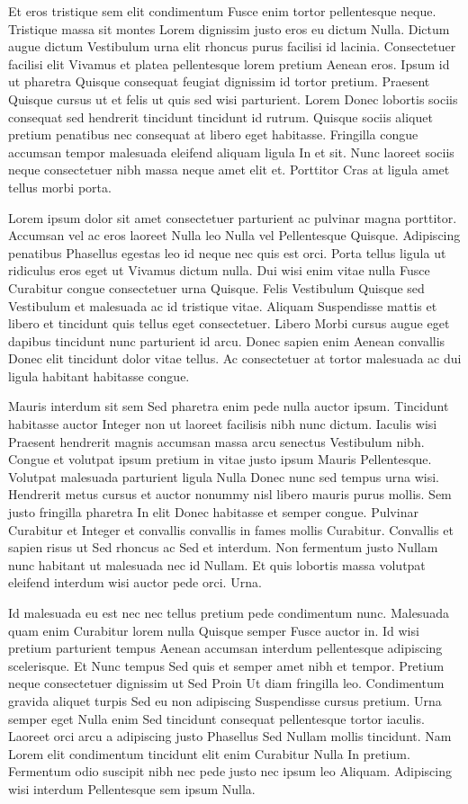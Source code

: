 Et eros tristique sem elit condimentum Fusce enim tortor pellentesque neque. Tristique massa sit montes Lorem dignissim justo eros eu dictum Nulla. Dictum augue dictum Vestibulum urna elit rhoncus purus facilisi id lacinia. Consectetuer facilisi elit Vivamus et platea pellentesque lorem pretium Aenean eros. Ipsum id ut pharetra Quisque consequat feugiat dignissim id tortor pretium. Praesent Quisque cursus ut et felis ut quis sed wisi parturient. Lorem Donec lobortis sociis consequat sed hendrerit tincidunt tincidunt id rutrum. Quisque sociis aliquet pretium penatibus nec consequat at libero eget habitasse. Fringilla congue accumsan tempor malesuada eleifend aliquam ligula In et sit. Nunc laoreet sociis neque consectetuer nibh massa neque amet elit et. Porttitor Cras at ligula amet tellus morbi porta.


Lorem ipsum dolor sit amet consectetuer parturient ac pulvinar magna porttitor. Accumsan vel ac eros laoreet Nulla leo Nulla vel Pellentesque Quisque. Adipiscing penatibus Phasellus egestas leo id neque nec quis est orci. Porta tellus ligula ut ridiculus eros eget ut Vivamus dictum nulla. Dui wisi enim vitae nulla Fusce Curabitur congue consectetuer urna Quisque. Felis Vestibulum Quisque sed Vestibulum et malesuada ac id tristique vitae. Aliquam Suspendisse mattis et libero et tincidunt quis tellus eget consectetuer. Libero Morbi cursus augue eget dapibus tincidunt nunc parturient id arcu. Donec sapien enim Aenean convallis Donec elit tincidunt dolor vitae tellus. Ac consectetuer at tortor malesuada ac dui ligula habitant habitasse congue. 

Mauris interdum sit sem Sed pharetra enim pede nulla auctor ipsum. Tincidunt habitasse auctor Integer non ut laoreet facilisis nibh nunc dictum. Iaculis wisi Praesent hendrerit magnis accumsan massa arcu senectus Vestibulum nibh. Congue et volutpat ipsum pretium in vitae justo ipsum Mauris Pellentesque. Volutpat malesuada parturient ligula Nulla Donec nunc sed tempus urna wisi. Hendrerit metus cursus et auctor nonummy nisl libero mauris purus mollis. Sem justo fringilla pharetra In elit Donec habitasse et semper congue. Pulvinar Curabitur et Integer et convallis convallis in fames mollis Curabitur. Convallis et sapien risus ut Sed rhoncus ac Sed et interdum. Non fermentum justo Nullam nunc habitant ut malesuada nec id Nullam. Et quis lobortis massa volutpat eleifend interdum wisi auctor pede orci. Urna.

Id malesuada eu est nec nec tellus pretium pede condimentum nunc. Malesuada quam enim Curabitur lorem nulla Quisque semper Fusce auctor in. Id wisi pretium parturient tempus Aenean accumsan interdum pellentesque adipiscing scelerisque. Et Nunc tempus Sed quis et semper amet nibh et tempor. Pretium neque consectetuer dignissim ut Sed Proin Ut diam fringilla leo. Condimentum gravida aliquet turpis Sed eu non adipiscing Suspendisse cursus pretium. Urna semper eget Nulla enim Sed tincidunt consequat pellentesque tortor iaculis. Laoreet orci arcu a adipiscing justo Phasellus Sed Nullam mollis tincidunt. Nam Lorem elit condimentum tincidunt elit enim Curabitur Nulla In pretium. Fermentum odio suscipit nibh nec pede justo nec ipsum leo Aliquam. Adipiscing wisi interdum Pellentesque sem ipsum Nulla.

